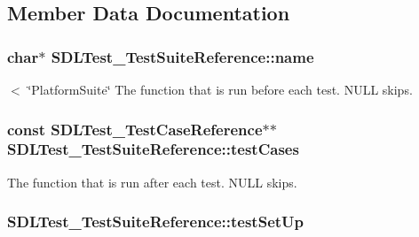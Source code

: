 \subsection{Member Data Documentation}
\hypertarget{struct_s_d_l_test___test_suite_reference_a8b002d932f91b321b384e59ae17f8f39}{
\subsubsection[{name}]{\setlength{\rightskip}{0pt plus 5cm}char$\ast$ S\-D\-L\-Test\-\_\-\-Test\-Suite\-Reference\-::name}}\label{struct_s_d_l_test___test_suite_reference_a8b002d932f91b321b384e59ae17f8f39}
$<$ \char`\"{}\-Platform\-Suite\char`\"{} The function that is run before each test. N\-U\-L\-L skips. \hypertarget{struct_s_d_l_test___test_suite_reference_a06d97ce5bcf9ceb1300cc4aa39c028d3}{
\subsubsection[{test\-Cases}]{\setlength{\rightskip}{0pt plus 5cm}const {\bf S\-D\-L\-Test\-\_\-\-Test\-Case\-Reference}$\ast$$\ast$ S\-D\-L\-Test\-\_\-\-Test\-Suite\-Reference\-::test\-Cases}}\label{struct_s_d_l_test___test_suite_reference_a06d97ce5bcf9ceb1300cc4aa39c028d3}
The function that is run after each test. N\-U\-L\-L skips. \hypertarget{struct_s_d_l_test___test_suite_reference_a8aa788b982efb93c93c2ab01202e0007}{
\subsubsection[{test\-Set\-Up}]{ S\-D\-L\-Test\-\_\-\-Test\-Suite\-Reference\-::test\-Set\-Up}}\label{struct_s_d_l_test___test_suite_reference_a8aa788b982efb93c93c2ab01202e0007}
